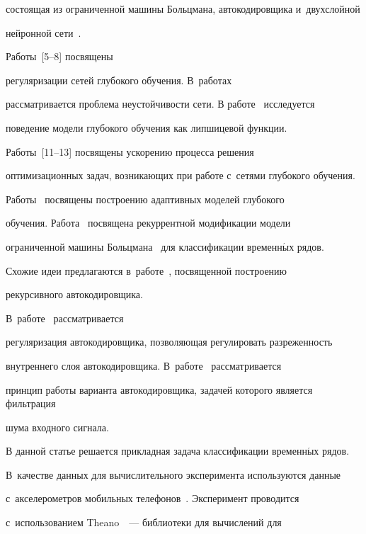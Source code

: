 состоящая из ограниченной машины Больцмана, автокодировщика и~двухслойной 


нейронной сети~\cite{foundamentals}. 





Работы~[5--8] посвящены 


регуляризации сетей глубокого обучения. В~работах~\cite{stab2, stab1} 


рассматривается проблема неустойчивости сети. В работе~\cite{stab1} исследуется 


поведение модели глубокого обучения как липшицевой функции. 


Работы~[11--13] посвящены ускорению процесса решения 


оптимизационных задач, возникающих при работе с~сетями глубокого обучения. 


Работы~\cite{stab2, ada} посвящены построению адаптивных моделей глубокого 


обучения. Работа~\cite{recrbm} посвящена рекуррентной модификации модели 


ограниченной машины Больцмана~\cite{rbm} для классификации временн$\acute{\mbox{ы}}$х рядов. 


Схожие идеи предлагаются в~работе~\cite{rae}, посвященной построению 


рекурсивного автокодировщика. 





В~работе~\cite{sparse} рассматривается 


регуляризация автокодировщика, позволяющая регулировать разреженность 


внутреннего слоя автокодировщика. В~работе~\cite{denoise} рассматривается 


принцип работы варианта автокодировщика, задачей которого является фильтрация 


шума входного сигнала.





В данной статье решается прикладная задача классификации временн$\acute{\mbox{ы}}$х рядов. 


В~качестве данных для вычислительного эксперимента используются данные 


с~акселерометров мобильных телефонов~\cite{wisdm}. Эксперимент проводится 


с~использованием Theano~\cite{theano2, theano1}~--- библиотеки для вычислений для 


